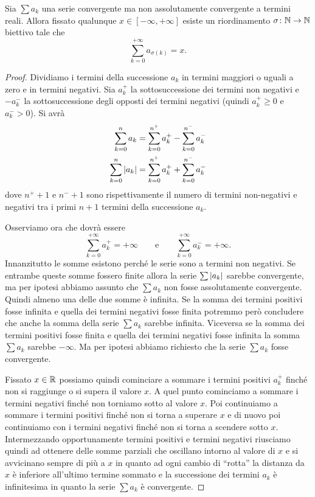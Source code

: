 \begin{theorem}%
\label{th:convergenza_condizionata}%
%
%
Sia $\sum a_k$ una serie convergente ma non assolutamente convergente a termini reali.
Allora fissato qualunque $x \in [-\infty , +\infty]$ esiste un riordinamento
$\sigma \colon \mathbb N \to \mathbb N$ biettivo tale che
\[
  \sum_{k=0}^{+\infty}  a_{\sigma(k)} = x.
\]
\end{theorem}
%
\begin{proof}
Dividiamo i termini della successione $a_k$ in termini maggiori o uguali a zero
e in termini negativi. Sia $a^+_k$ la sottosuccessione dei termini non negativi
e $-a^-_k$ la sottosuccessione degli opposti
dei termini negativi (quindi $a^+_k\ge 0$ e $a^-_k > 0$). Si avrà
\begin{align*}
  \sum_{k=0}^n a_k &= \sum_{k=0}^{n^+} a^+_k - \sum_{k=0}^{n^-} a^-_k \\
  \sum_{k=0}^n {\left|a_k\right|} &= \sum_{k=0}^{n^+} a^+_k + \sum_{k=0}^{n^-} a^-_k
\end{align*}
dove $n^+ +1$ e $n^-+1$ sono rispettivamente
il numero di termini non-negativi e negativi
tra i primi $n+1$ termini della successione $a_k$.

Osserviamo ora che dovrà essere
\[
\sum_{k=0}^{+\infty} a_k^+ = +\infty \qquad \text{e} \qquad
\sum_{k=0}^{+\infty} a_k^- = +\infty.
\]
Innanzitutto le somme esistono perché le serie sono a termini non negativi.
Se entrambe queste somme fossero finite allora la serie $\sum{\left|a_k\right|}$ sarebbe convergente, ma per ipotesi abbiamo assunto che $\sum a_k$ non fosse
assolutamente convergente.
Quindi almeno una delle due somme è infinita. Se la somma dei termini positivi
fosse infinita e quella dei termini negativi fosse finita potremmo però
concludere che anche la somma della serie $\sum a_k$ sarebbe infinita.
Viceversa se la somma dei termini positivi fosse finita e quella dei termini
negativi fosse infinita la somma $\sum a_k$ sarebbe $-\infty$. Ma per ipotesi
abbiamo richiesto che la serie $\sum a_k$ fosse convergente.

Fissato $x\in \mathbb R$ possiamo quindi cominciare a sommare i termini positivi
$a^+_k$ finché non si raggiunge o si supera il valore $x$. A quel punto cominciamo a sommare i termini negativi finché non torniamo sotto al valore $x$.
Poi continuiamo a sommare i termini positivi finché non si torna a superare $x$
e di nuovo poi continuiamo con i termini negativi finché non si torna a scendere
sotto $x$. Intermezzando opportunamente termini positivi e termini negativi
riusciamo quindi ad ottenere delle somme parziali che oscillano intorno al valore di $x$ e si avvicinano sempre di più a $x$ in quanto ad ogni cambio di ``rotta'' la distanza da $x$ è inferiore all'ultimo termine sommato e la successione dei termini $a_k$ è infinitesima in quanto la serie $\sum a_k$ è convergente.


\end{proof}
